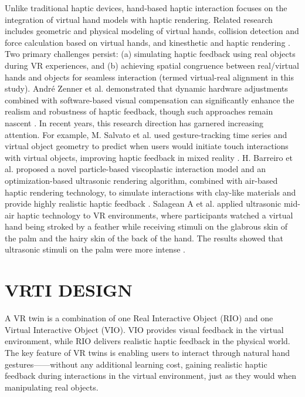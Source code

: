 \documentclass[runningheads]{llncs}
\begin{document}
Unlike traditional haptic devices, hand-based haptic interaction focuses on the integration of virtual hand models with haptic rendering. Related research includes geometric and physical modeling of virtual hands, collision detection and force calculation based on virtual hands, and kinesthetic and haptic rendering \cite{tong2023survey}. Two primary challenges persist: (a) simulating haptic feedback using real objects during VR experiences, and (b) achieving spatial congruence between real/virtual hands and objects for seamless interaction (termed virtual-real alignment in this study). André Zenner et al. demonstrated that dynamic hardware adjustments combined with software-based visual compensation can significantly enhance the realism and robustness of haptic feedback, though such approaches remain nascent \cite{zenner2021combining}. In recent years, this research direction has garnered increasing attention. For example, M. Salvato et al. used gesture-tracking time series and virtual object geometry to predict when users would initiate touch interactions with virtual objects, improving haptic feedback in mixed reality \cite{salvato2022predicting}. H. Barreiro et al. proposed a novel particle-based viscoplastic interaction model and an optimization-based ultrasonic rendering algorithm, combined with air-based haptic rendering technology, to simulate interactions with clay-like materials and provide highly realistic haptic feedback \cite{barreiro2021natural}. Salagean A et al. applied ultrasonic mid-air haptic technology to VR environments, where participants watched a virtual hand being stroked by a feather while receiving stimuli on the glabrous skin of the palm and the hairy skin of the back of the hand. The results showed that ultrasonic stimuli on the palm were more intense \cite{salagean2022virtual}.

\section{VRTI DESIGN}
A VR twin is a combination of one Real Interactive Object (RIO) and one Virtual Interactive Object (VIO). VIO provides visual feedback in the virtual environment, while RIO delivers realistic haptic feedback in the physical world. The key feature of VR twins is enabling users to interact through natural hand gestures——without any additional learning cost, gaining realistic haptic feedback during interactions in the virtual environment, just as they would when manipulating real objects.
\end{document}
